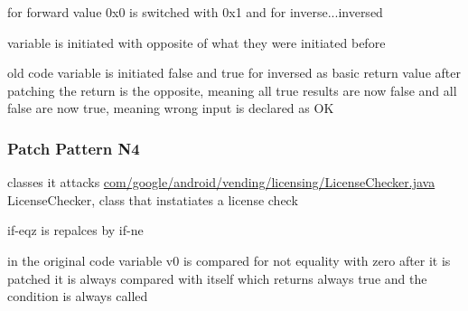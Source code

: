 

for forward value 0x0 is switched with 0x1 and for inverse...inversed



variable is initiated with opposite of what they were initiated before




old code variable is initiated false and true for inversed as basic return value
after patching the return is the opposite, meaning all true results are now false and all false are now true, meaning wrong input is declared as OK
\subsubsection{Patch Pattern N4}
classes it attacks %
\url{com/google/android/vending/licensing/LicenseChecker.java}
LicenseChecker, class that instatiates a license check\cite{developersLicensingReference}



if-eqz is repalces by if-ne


in the original code variable v0 is compared for not equality with zero
after it is patched it is always compared with itself which returns always true and the condition is always called



